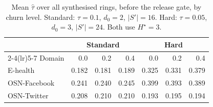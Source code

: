 \begin{table}[htbp]
\centering
\caption{Mean $\hat{\tau}$ over all synthesised rings, before the release gate, by churn level. Standard: $\tau=0.1$, $d_0=2$, $|S'|=16$. Hard: $\tau=0.05$, $d_0=3$, $|S'|=24$. Both use $H^\star=3$.}
\label{tab:prime_sparsity_churn_summary}
\small
\setlength{\tabcolsep}{4pt}
\begin{tabular}{lrrrrrr}
\toprule
 & \multicolumn{3}{c}{Standard} & \multicolumn{3}{c}{Hard}\\
\cmidrule(lr){2-4}\cmidrule(lr){5-7}
Domain & 0.0 & 0.2 & 0.4 & 0.0 & 0.2 & 0.4\\
\midrule
E-health & 0.182 & 0.181 & 0.189 & 0.325 & 0.331 & 0.379\\
OSN-Facebook & 0.241 & 0.240 & 0.245 & 0.399 & 0.393 & 0.389\\
OSN-Twitter & 0.208 & 0.210 & 0.210 & 0.193 & 0.195 & 0.194\\
\bottomrule
\end{tabular}
\end{table}
